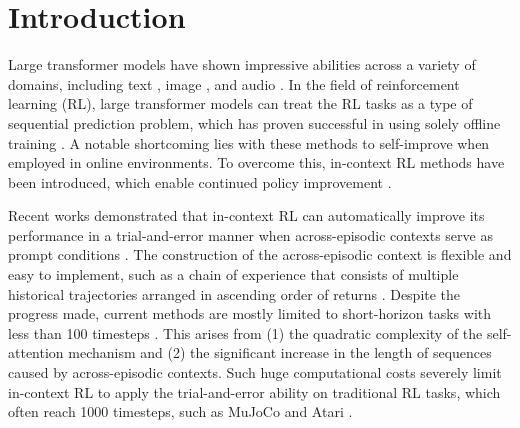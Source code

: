 \section{Introduction}

Large transformer models \cite{4} have shown impressive abilities across a variety of domains, including text \cite{5}, image \cite{6}, and audio \cite{7}. 
In the field of reinforcement learning (RL), large transformer models can treat the RL tasks as a type of sequential prediction problem, which has proven successful in using solely offline training \cite{14,27}.
A notable shortcoming lies with these methods to self-improve when employed in online environments. To overcome this, in-context RL methods have been introduced, which enable continued policy improvement \cite{8}.

Recent works demonstrated that in-context RL can automatically improve its performance in a trial-and-error manner when across-episodic contexts serve as prompt conditions \cite{3}. The construction of the across-episodic context is flexible and easy to implement, such as a chain of experience that consists of multiple historical trajectories arranged in ascending order of returns \cite{1}. Despite the progress made, current methods are mostly limited to short-horizon tasks with less than 100 timesteps \cite{8}. This arises from (1) the quadratic complexity of the self-attention mechanism and (2) the significant increase in the length of sequences caused by across-episodic contexts. Such huge computational costs severely limit in-context RL to apply the trial-and-error ability on traditional RL tasks, which often reach 1000 timesteps, such as MuJoCo \cite{13} and Atari \cite{15}.

